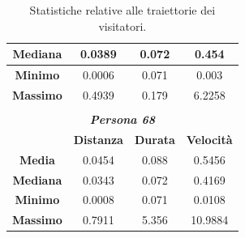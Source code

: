 \documentclass[12pt]{article}
\begin{document}
\begin{table}[!ht]
\begin{tabular}{cccc}
        \multicolumn{1}{|c|}{\textbf{Mediana}} & \multicolumn{1}{c|}{0.0389}            & \multicolumn{1}{c|}{0.072}           & \multicolumn{1}{c|}{0.454}             \\ \hline
        \multicolumn{1}{|c|}{\textbf{Minimo}}  & \multicolumn{1}{c|}{0.0006}            & \multicolumn{1}{c|}{0.071}           & \multicolumn{1}{c|}{0.003}             \\ \hline
        \multicolumn{1}{|c|}{\textbf{Massimo}} & \multicolumn{1}{c|}{0.4939}            & \multicolumn{1}{c|}{0.179}           & \multicolumn{1}{c|}{6.2258}            \\ \hline
                                               &                                        &                                      &                                        \\
        \multicolumn{4}{c}{\textit{\textbf{Persona 68}}}                                                                                                                \\ \cline{2-4}
        \multicolumn{1}{c|}{}                  & \multicolumn{1}{c|}{\textbf{Distanza}} & \multicolumn{1}{c|}{\textbf{Durata}} & \multicolumn{1}{c|}{\textbf{Velocità}} \\ \hline
        \multicolumn{1}{|c|}{\textbf{Media}}   & \multicolumn{1}{c|}{0.0454}            & \multicolumn{1}{c|}{0.088}           & \multicolumn{1}{c|}{0.5456}            \\ \hline
        \multicolumn{1}{|c|}{\textbf{Mediana}} & \multicolumn{1}{c|}{0.0343}            & \multicolumn{1}{c|}{0.072}           & \multicolumn{1}{c|}{0.4169}            \\ \hline
        \multicolumn{1}{|c|}{\textbf{Minimo}}  & \multicolumn{1}{c|}{0.0008}            & \multicolumn{1}{c|}{0.071}           & \multicolumn{1}{c|}{0.0108}            \\ \hline
        \multicolumn{1}{|c|}{\textbf{Massimo}} & \multicolumn{1}{c|}{0.7911}            & \multicolumn{1}{c|}{5.356}           & \multicolumn{1}{c|}{10.9884}           \\ \hline
    \end{tabular}
    \caption{Statistiche relative alle traiettorie dei visitatori.}
    \label{trajectories_aggregates_informations}
\end{table}
\end{document}
